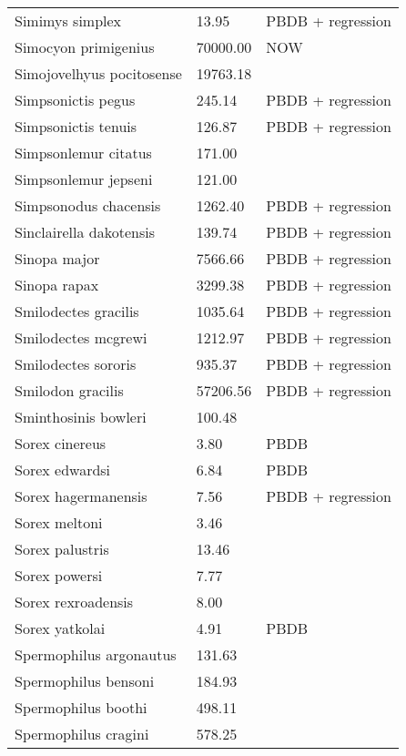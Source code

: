 \documentclass{article}
\begin{document}
\begin{center}
\begin{longtable}{p{} p{} p{}}
    Simimys simplex & 13.95 & PBDB + regression \\ 
    Simocyon primigenius & 70000.00 & NOW \\ 
    Simojovelhyus pocitosense & 19763.18 & \cite{Wang1999} \\ 
    Simpsonictis pegus & 245.14 & PBDB + regression \\ 
    Simpsonictis tenuis & 126.87 & PBDB + regression \\ 
    Simpsonlemur citatus & 171.00 & \cite{Soligo2006} \\ 
    Simpsonlemur jepseni & 121.00 & \cite{Soligo2006} \\ 
    Simpsonodus chacensis & 1262.40 & PBDB + regression \\ 
    Sinclairella dakotensis & 139.74 & PBDB + regression \\ 
    Sinopa major & 7566.66 & PBDB + regression \\ 
    Sinopa rapax & 3299.38 & PBDB + regression \\ 
    Smilodectes gracilis & 1035.64 & PBDB + regression \\ 
    Smilodectes mcgrewi & 1212.97 & PBDB + regression \\ 
    Smilodectes sororis & 935.37 & PBDB + regression \\ 
    Smilodon gracilis & 57206.56 & PBDB + regression \\ 
    Sminthosinis bowleri & 100.48 & \cite{Tomiya2013} \\ 
    Sorex cinereus & 3.80 & PBDB \\ 
    Sorex edwardsi & 6.84 & PBDB \\ 
    Sorex hagermanensis & 7.56 & PBDB + regression \\ 
    Sorex meltoni & 3.46 & \cite{Tomiya2013} \\ 
    Sorex palustris & 13.46 & \cite{Smith2004} \\ 
    Sorex powersi & 7.77 & \cite{Tomiya2013} \\ 
    Sorex rexroadensis & 8.00 & \cite{McKenna2011} \\ 
    Sorex yatkolai & 4.91 & PBDB \\ 
    Spermophilus argonautus & 131.63 & \cite{Tomiya2013} \\ 
    Spermophilus bensoni & 184.93 & \cite{Tomiya2013} \\ 
    Spermophilus boothi & 498.11 & \cite{Secord2008a} \\ 
    Spermophilus cragini & 578.25 & \cite{Tomiya2013} \\ 

\end{longtable}
\end{center}
\end{document}
